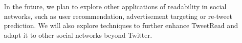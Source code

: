 \documentclass{sig-alternate-05-2015}
\begin{document}
In the future, we plan to explore other applications of readability in social networks, such as user recommendation, advertisement targeting or re-tweet prediction. We will also explore techniques to further enhance TweetRead and adapt it to other social networks beyond Twitter.

%

%
%
\end{document}
